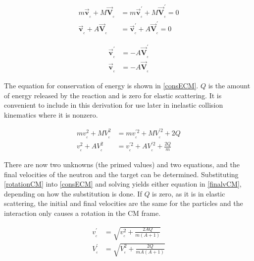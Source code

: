 \begin{equation}
\begin{split}
m \boldsymbol{\vec{v}_{_\mathrm{c}}} + M \boldsymbol{\vec{V}_{_\mathrm{c}}} &= m \boldsymbol{\vec{v}_{_\mathrm{c}}^\prime} + M \boldsymbol{\vec{V}_{_\mathrm{c}}^\prime} = 0\\
    \boldsymbol{\vec{v}_{_\mathrm{c}}} + A  \boldsymbol{\vec{V}_{_\mathrm{c}}} &=     \boldsymbol{\vec{v}_{_\mathrm{c}}^\prime} + A  \boldsymbol{\vec{V}_{_\mathrm{c}}^\prime} = 0
\end{split}
\label{consMomCM}
\end{equation}

\begin{equation}
\begin{split}
\boldsymbol{\vec{v}_{_\mathrm{c}}^\prime} &= - A  \boldsymbol{\vec{V}_{_\mathrm{c}}^\prime} \\
\boldsymbol{\vec{v}_{_\mathrm{c}}} &= -A  \boldsymbol{\vec{V}_{_\mathrm{c}}}
\end{split}
\label{rotationCM}
\end{equation}

The equation for conservation of energy is shown in \ref{consECM}.  $Q$ is the amount of energy released by the reaction and is zero for elastic scattering.  It is convenient to include in this derivation for use later in inelastic collision kinematics where it is nonzero.

\begin{equation}
\begin{split}
m v_{_\mathrm{c}}^2 + M V_{_\mathrm{c}}^2 &= m v_{_\mathrm{c}}^{\prime2} + M V_{_\mathrm{c}}^{\prime2} + 2Q \\
    v_{_\mathrm{c}}^2 + A  V_{_\mathrm{c}}^2 &=     v_{_\mathrm{c}}^{\prime2} + A  V_{_\mathrm{c}}^{\prime2} + \frac{2Q}{m}
\end{split}
\label{consECM}
\end{equation}

There are now two unknowns (the primed values) and two equations, and the final velocities of the neutron and the target can be determined.  Substituting \eqref{rotationCM} into \eqref{consECM} and solving yields either equation in \eqref{finalvCM}, depending on how the substitution is done.  If $Q$ is zero, as it is in elastic scattering, the initial and final velocities are the same for the particles and the interaction only causes a rotation in the CM frame.

\begin{equation}
\begin{split}
v_{_\mathrm{c}}^{\prime} &=  \sqrt{ v_{_\mathrm{c}}^{2} + \frac{2AQ}{m(A+1)}  }  \\
V_{_\mathrm{c}}^{\prime} &= \sqrt{ V_{_\mathrm{c}}^{2} + \frac{2Q}{mA(A+1)}  } 
\end{split}
\label{finalvCM}
\end{equation}

